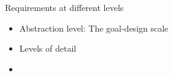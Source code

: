 
\begin{Slide}{Requirements at different levels}

\begin{itemize}
\item Abstraction level: The goal-design scale
\item Levels of detail
\item \TODO{}

\end{itemize}
\end{Slide}